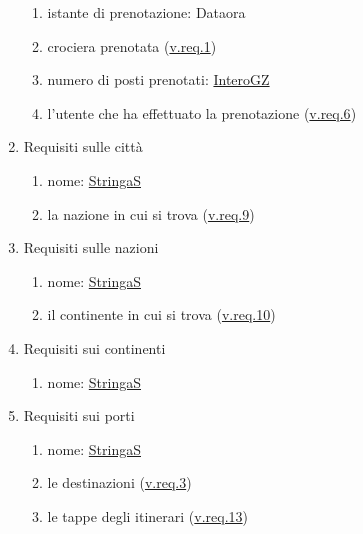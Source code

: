 \documentclass{article}
\begin{document}
\begin{enumerate}
\begin{enumerate}
        \item istante di prenotazione: Dataora\label{sec:RequisitiPrenotazioneIstanteDiPrenotazione}
        \item crociera prenotata (\hyperref[sec:RequisitiCrociera]{v.req.1})\label{sec:RequisitiPrenotazioneCrocieraPrenotata}
        \item numero di posti prenotati: \hyperref[sec:InteroGZ]{InteroGZ}\label{sec:RequisitiPrenotazioneNumeroDiPostiPrenotati}
        \item l'utente che ha effettuato la prenotazione (\hyperref[sec:RequisitiUtente]{v.req.6})\label{sec:RequisitiPrenotazioneUtente}
    \end{enumerate}
    \item Requisiti sulle città\label{sec:RequisitiCittà}
    \begin{enumerate}
        \item nome: \hyperref[sec:StringaS]{StringaS}\label{sec:RequisitiCittàNome}
        \item la nazione in cui si trova (\hyperref[sec:RequisitiNazione]{v.req.9})\label{sec:RequisitiCittàNazione}
    \end{enumerate}
    \item Requisiti sulle nazioni\label{sec:RequisitiNazione}
    \begin{enumerate}
        \item nome: \hyperref[sec:StringaS]{StringaS}\label{sec:RequisitiNazioneNome}
        \item il continente in cui si trova (\hyperref[sec:RequisitiContinente]{v.req.10})\label{sec:RequisitiNazioneContinente}
    \end{enumerate}
    \item Requisiti sui continenti\label{sec:RequisitiContinente}
    \begin{enumerate}
        \item nome: \hyperref[sec:StringaS]{StringaS}\label{sec:RequisitiContinenteNome}
    \end{enumerate}
    \item Requisiti sui porti\label{sec:RequisitiPorto}
    \begin{enumerate}
        \item nome: \hyperref[sec:StringaS]{StringaS}\label{sec:RequisitiPortoNome}
        \item le destinazioni (\hyperref[sec:RequisitiDestinazione]{v.req.3})\label{sec:RequisitiPortoDestinazioni}
        \item le tappe degli itinerari (\hyperref[sec:RequisitiItinerario]{v.req.13})\label{sec:RequisitiPortoTappe}

\end{enumerate}
\end{enumerate}
\end{document}

